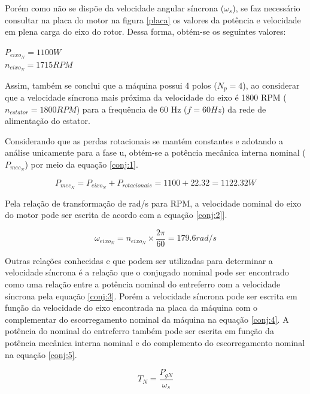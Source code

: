Porém como não se dispõe da velocidade angular síncrona ($\omega_s$), se faz necessário consultar na placa do motor na figura \ref{placa} os valores da potência e velocidade em plena carga do eixo do rotor. Dessa forma, obtém-se os seguintes valores:

\begin{center}
    $P_{eixo_N} = 1100 W$ \vspace{5pt}\\
    $n_{eixo_N} = 1715 RPM$
\end{center}

Assim, também se conclui que a máquina possui 4 polos ($N_p = 4$), ao considerar que a velocidade síncrona mais próxima da velocidade do eixo é 1800 RPM ($n_{estator}=1800 RPM$) para a frequência de 60 Hz ($f=60Hz$) da rede de alimentação do estator.

Considerando que as perdas rotacionais se mantém constantes e adotando a análise unicamente para a fase u, obtém-se a potência mecânica interna nominal ($P_{mec_N}$) por meio da equação \ref{conj:1}.

\begin{equation} \label{conj:1}
P_{mec_N} = P_{eixo_N} + P_{rotacionais} = 1100 + 22.32 = 1122.32 W
\end{equation}

Pela relação de transformação de rad/s para RPM, a velocidade nominal do eixo do motor pode ser escrita de acordo com a equação \ref{conj:2}].

\begin{equation} \label{conj:2}
\omega_{eixo_N} = n_{eixo_N}\times \frac{2\pi}{60} = 179.6 rad/s
\end{equation}

Outras relações conhecidas e que podem ser utilizadas para determinar a velocidade síncrona é a relação que o conjugado nominal pode ser encontrado como uma relação entre a potência nominal do entreferro com a velocidade síncrona pela equação \ref{conj:3}. Porém a velocidade síncrona pode ser escrita em função da velocidade do eixo encontrada na placa da máquina com o complementar do escorregamento nominal da máquina na equação \ref{conj:4}. A potência do nominal do entreferro também pode ser escrita em função da potência mecânica interna nominal e do complemento do escorregamento nominal na equação \ref{conj:5}.

\begin{equation} \label{conj:3}
T_N = \frac{P_{gN}}{\omega_s}
\end{equation}


